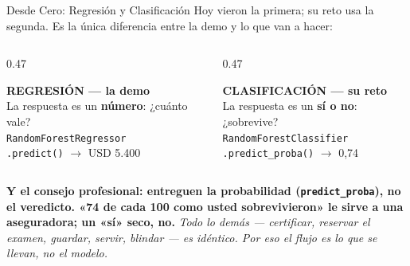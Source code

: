 \documentclass[aspectratio=169, 11pt]{beamer}
\begin{document}
\begin{frame}[shrink=5]{Desde Cero: Regresión y Clasificación}
  \vspace{2pt}
  {\footnotesize\color{textMuted}
   Hoy vieron la primera; su reto usa la segunda. Es la única diferencia
   entre la demo y lo que van a hacer:}
  \vspace{6pt}
  \begin{columns}[T]
    \begin{column}{0.47\textwidth}
      \begin{tcolorbox}[colback=arcaGray, colframe=arcaDark, boxrule=0pt,
        leftrule=3pt, arc=3pt, left=8pt, right=8pt, top=4pt, bottom=4pt]
        {\scriptsize\color{arcaDark}\bfseries REGRESIÓN --- la demo}\\[3pt]
        {\scriptsize\color{textMuted}
         La respuesta es un \textbf{número}: ¿cuánto vale?\\[3pt]
         \texttt{RandomForestRegressor}\\
         \texttt{.predict()} $\to$ USD 5.400}
      \end{tcolorbox}
    \end{column}
    \begin{column}{0.47\textwidth}
      \begin{tcolorbox}[colback=arcaGray, colframe=codeGreen, boxrule=0pt,
        leftrule=3pt, arc=3pt, left=8pt, right=8pt, top=4pt, bottom=4pt]
        {\scriptsize\color{codeGreen}\bfseries CLASIFICACIÓN --- su reto}\\[3pt]
        {\scriptsize\color{textMuted}
         La respuesta es un \textbf{sí o no}: ¿sobrevive?\\[3pt]
         \texttt{RandomForestClassifier}\\
         \texttt{.predict\_proba()} $\to$ 0,74}
      \end{tcolorbox}
    \end{column}
  \end{columns}
  \vspace{7pt}
  {\footnotesize\color{arcaDark}\bfseries
   Y el consejo profesional: entreguen la \textbf{probabilidad}
   (\texttt{predict\_proba}), no el veredicto. «74 de cada 100 como usted
   sobrevivieron» le sirve a una aseguradora; un «sí» seco, no.}
  \vspace{5pt}
  {\scriptsize\color{textMuted}\itshape
   Todo lo demás --- certificar, reservar el examen, guardar, servir,
   blindar --- es idéntico. Por eso el flujo es lo que se llevan, no el
   modelo.}
\end{frame}
\end{document}
